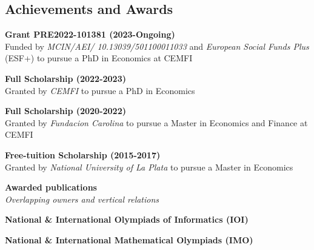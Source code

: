 \documentclass[margin,center,a4paper]{res}
\begin{document}
\begin{resume}
\clearpage
\section{Achievements and Awards}

\textbf{Grant PRE2022-101381 (2023-Ongoing)} \\
Funded by {\sl MCIN/AEI/ 10.13039/501100011033} and {\sl European Social Funds Plus} (ESF+) to pursue a PhD in Economics at CEMFI

\textbf{Full Scholarship (2022-2023)} \\
Granted by {\sl CEMFI} to pursue a PhD in Economics

\textbf{Full Scholarship (2020-2022)} \\
Granted by {\sl Fundacion Carolina} to pursue a Master in Economics and Finance at CEMFI

\textbf{Free-tuition Scholarship (2015-2017)} \\
Granted by {\sl National University of La Plata} to pursue a Master in Economics

\textbf{Awarded publications} \\
\textit{Overlapping owners and vertical relations} \\

\textbf{National \& International Olympiads of Informatics (IOI)} \\

\textbf{National \& International Mathematical Olympiads (IMO)} \\


\end{resume}
\end{document}
